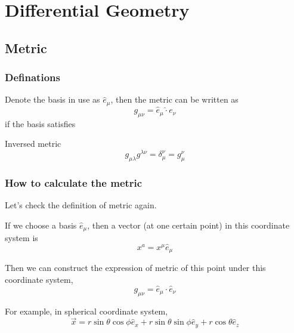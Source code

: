 \section{Differential Geometry}

\subsection{Metric}

\subsubsection{Definations}

Denote the basis in use as $\hat e_\mu$, then the metric can be written as
\begin{equation}
g_{\mu\nu}=\hat e_\mu \hat \cdot e_\nu
\end{equation}
if the basis satisfies

Inversed metric
\begin{equation}
g_{\mu\lambda}g^{\lambda\nu}=\delta_\mu^\nu = g_\mu^\nu
\end{equation}





\subsubsection{How to calculate the metric}

Let's check the definition of metric again.

If we choose a basis $\hat e_\mu$, then a vector (at one certain point) in this coordinate system is
\begin{equation}
x^a=x^\mu \hat e_\mu
\end{equation}

Then we can construct the expression of metric of this point under this coordinate system,
\begin{equation}
g_{\mu\nu}=\hat e_\mu\cdot \hat e_\nu
\end{equation}

For example, in spherical coordinate system, 
\begin{equation}
\vec x=r\sin \theta\cos\phi \hat e_x+r\sin\theta\sin\phi \hat e_y+r\cos\theta \hat e_z \label{eq:relativity_metric_point}
\end{equation}



